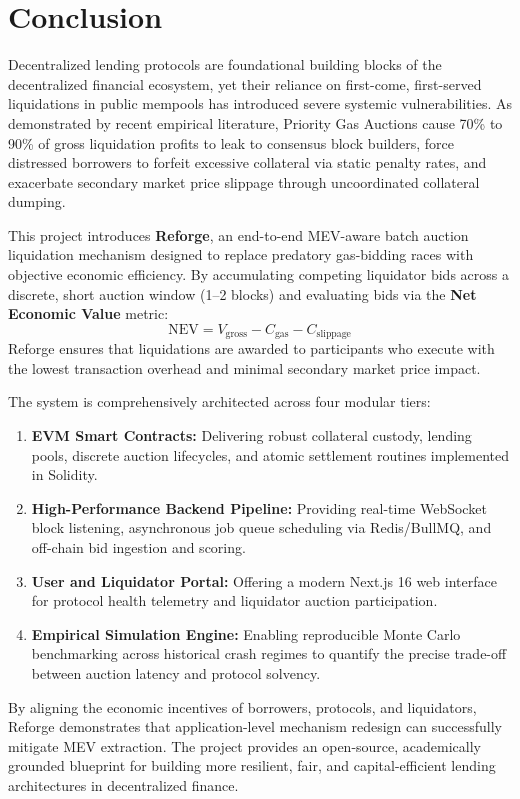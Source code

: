 \chapter{Conclusion}
\label{chap:conclusion}

Decentralized lending protocols are foundational building blocks of the decentralized financial ecosystem, yet their reliance on first-come, first-served liquidations in public mempools has introduced severe systemic vulnerabilities. As demonstrated by recent empirical literature, Priority Gas Auctions cause 70\% to 90\% of gross liquidation profits to leak to consensus block builders, force distressed borrowers to forfeit excessive collateral via static penalty rates, and exacerbate secondary market price slippage through uncoordinated collateral dumping.

This project introduces \textbf{Reforge}, an end-to-end MEV-aware batch auction liquidation mechanism designed to replace predatory gas-bidding races with objective economic efficiency. By accumulating competing liquidator bids across a discrete, short auction window (1--2 blocks) and evaluating bids via the \textbf{Net Economic Value} metric:
\begin{equation}
\mathrm{NEV} = V_{\mathrm{gross}} - C_{\mathrm{gas}} - C_{\mathrm{slippage}}
\end{equation}
Reforge ensures that liquidations are awarded to participants who execute with the lowest transaction overhead and minimal secondary market price impact.

The system is comprehensively architected across four modular tiers:
\begin{enumerate}
    \item \textbf{EVM Smart Contracts:} Delivering robust collateral custody, lending pools, discrete auction lifecycles, and atomic settlement routines implemented in Solidity.
    \item \textbf{High-Performance Backend Pipeline:} Providing real-time WebSocket block listening, asynchronous job queue scheduling via Redis/BullMQ, and off-chain bid ingestion and scoring.
    \item \textbf{User and Liquidator Portal:} Offering a modern Next.js 16 web interface for protocol health telemetry and liquidator auction participation.
    \item \textbf{Empirical Simulation Engine:} Enabling reproducible Monte Carlo benchmarking across historical crash regimes to quantify the precise trade-off between auction latency and protocol solvency.
\end{enumerate}

By aligning the economic incentives of borrowers, protocols, and liquidators, Reforge demonstrates that application-level mechanism redesign can successfully mitigate MEV extraction. The project provides an open-source, academically grounded blueprint for building more resilient, fair, and capital-efficient lending architectures in decentralized finance.
